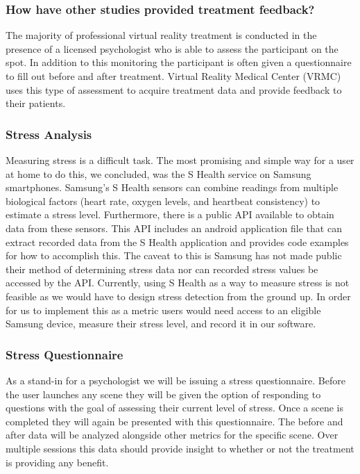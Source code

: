 \documentclass[a4paper,10pt]{article}
\begin{document}
\subsubsection{How have other studies provided treatment feedback?}
The majority of professional virtual reality treatment is conducted in the presence of a licensed psychologist who is able to assess the participant on the spot. In addition to this monitoring the participant is often given a questionnaire to fill out before and after treatment. Virtual Reality Medical Center (VRMC) uses this type of assessment to acquire treatment data and provide feedback to their patients. %

\subsubsection{Stress Analysis}
Measuring stress is a difficult task. The most promising and simple way for a user at home to do this, we concluded, was the S Health service on Samsung smartphones. Samsung's S Health sensors can combine readings from multiple biological factors (heart rate, oxygen levels, and heartbeat consistency) to estimate a stress level. Furthermore, there is a public API available to obtain data from these sensors. This API includes an android application file that can extract recorded data from the S Health application and provides code examples for how to accomplish this. The caveat to this is Samsung has not made public their method of determining stress data nor can recorded stress values be accessed by the API. Currently, using S Health as a way to measure stress is not feasible as we would have to design stress detection from the ground up. In order for us to implement this as a metric users would need access to an eligible Samsung device, measure their stress level, and record it in our software.
\subsubsection{Stress Questionnaire}
As a stand-in for a psychologist we will be issuing a stress questionnaire. Before the user launches any scene they will be given the option of responding to questions with the goal of assessing their current level of stress. Once a scene is completed they will again be presented with this questionnaire. The before and after data will be analyzed alongside other metrics for the specific scene. Over multiple sessions this data should provide insight to whether or not the treatment is providing any benefit.
\end{document}

